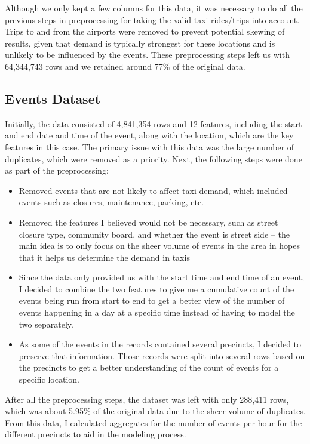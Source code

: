 \documentclass[11pt]{article}
\begin{document}
Although we only kept a few columns for this data, it was necessary to do all the previous steps in preprocessing for taking the valid taxi rides/trips into account. Trips to and from the airports were removed to prevent potential skewing of results, given that demand is typically strongest for these locations and is unlikely to be influenced by the events. These preprocessing steps left us with 64,344,743 rows and we retained around 77\% of the original data.

\subsection{Events Dataset}
Initially, the data consisted of 4,841,354 rows and 12 features, including the start and end date and time of the event, along with the location, which are the key features in this case. The primary issue with this data was the large number of duplicates, which were removed as a priority.
Next, the following steps were done as part of the preprocessing:
\begin{itemize}
    \item Removed events that are not likely to affect taxi demand, which included events such as closures, maintenance, parking, etc.
    \item Removed the features I believed would not be necessary, such as street closure type, community board, and whether the event is street side – the main idea is to only focus on the sheer volume of events in the area in hopes that it helps us determine the demand in taxis
    \item Since the data only provided us with the start time and end time of an event, I decided to combine the two features to give me a cumulative count of the events being run from start to end to get a better view of the number of events happening in a day at a specific time instead of having to model the two separately.
    \item As some of the events in the records contained several precincts, I decided to preserve that information. Those records were split into several rows based on the precincts to get a better understanding of the count of events for a specific location.
\end{itemize}
After all the preprocessing steps, the dataset was left with only 288,411 rows, which was about 5.95\% of the original data due to the sheer volume of duplicates.
From this data, I calculated aggregates for the number of events per hour for the different precincts to aid in the modeling process.
\end{document}
